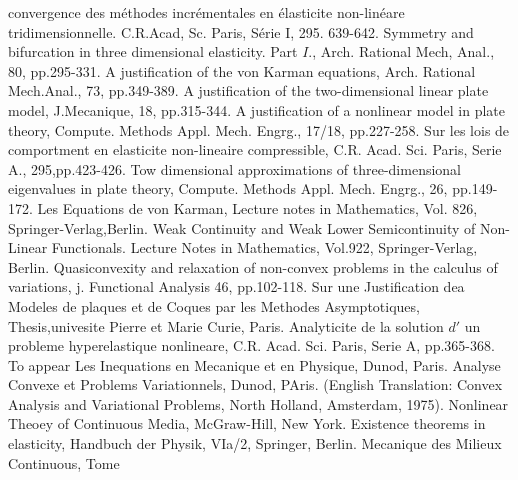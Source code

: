 \begin{thebibliography}{99}
  convergence des m\'ethodes incr\'ementales en \'elasticite non-lin\'eare
  tridimensionnelle. C.R.Acad, Sc. Paris, S\'erie I, 295. 639-642.  
  Symmetry and bifurcation in three dimensional elasticity. Part
  $I$., Arch. Rational Mech, Anal., 80, pp.295-331. 
 A justification of the von Karman
  equations, Arch. Rational Mech.Anal., 73, pp.349-389. 
 A
justification 
  of the two-dimensional linear plate model, J.Mecanique,
  18, pp.315-344. 
 A justification
  of a nonlinear model in plate theory, Compute. Methods
  Appl. Mech. Engrg., 17/18, pp.227-258.  
 Sur les lois de
  comportment en elasticite non-lineaire compressible,
  C.R. Acad. Sci. Paris, Serie A., 295,pp.423-426. 
 Tow dimensional
  approximations of three-dimensional eigenvalues in plate theory,
  Compute. Methods Appl. Mech. Engrg., 26, pp.149-172.  
 Les Equations de
  von Karman, Lecture notes in Mathematics, Vol. 826,
  Springer-Verlag,Berlin.  
 Weak Continuity and Weak Lower
  Semicontinuity of Non-Linear Functionals. Lecture Notes in
  Mathematics, Vol.922, Springer-Verlag, Berlin. 
 Quasiconvexity and relaxation of
  non-convex problems in the calculus of variations, j. Functional
  Analysis 46, pp.102-118. 
 Sur une Justification dea Modeles
  de plaques et de Coques par les Methodes Asymptotiques,
  Thesis,univesite Pierre et Marie Curie, Paris. 
 Analyticite de la
  solution $d'$ un probleme hyperelastique nonlineare,
  C.R. Acad. Sci. Paris, Serie A, pp.365-368. 
 To appear
 Les Inequations en
  Mecanique et en Physique, Dunod, Paris. 
 Analyse Convexe et
  Problems Variationnels, Dunod, PAris. (English Translation: Convex
  Analysis and Variational Problems, North Holland, Amsterdam, 1975). 
 Nonlinear Theoey of Continuous
  Media, McGraw-Hill, New York. 
 Existence theorems in elasticity,
  Handbuch der Physik, VIa/2, Springer, Berlin. 
 Mecanique des Milieux Continuous, Tome

\end{thebibliography}
